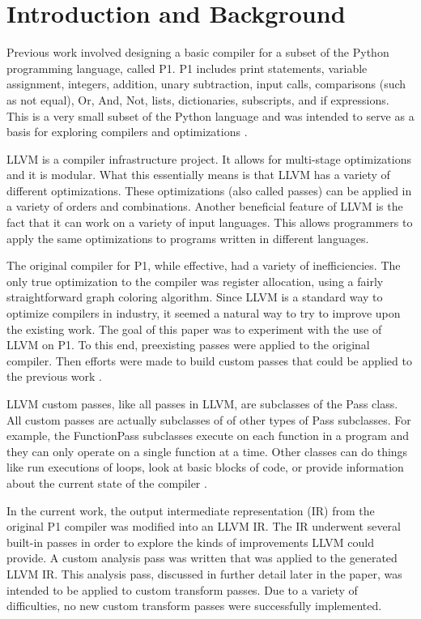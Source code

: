 \section{Introduction and Background}
Previous work involved designing a basic compiler for a subset of the Python programming language, called P1. P1 includes print statements, variable assignment, integers, addition, unary subtraction, input calls, comparisons (such as not equal), Or, And, Not, lists, dictionaries, subscripts, and if expressions. This is a very small subset of the Python language and was intended to serve as a basis for exploring compilers and optimizations \cite{Chang17}.

LLVM is a compiler infrastructure project. It allows for multi-stage optimizations and it is modular. What this essentially means is that LLVM has a variety of different optimizations. These optimizations (also called passes) can be applied in a variety of orders and combinations. Another beneficial feature of LLVM is the fact that it can work on a variety of input languages. This allows programmers to apply the same optimizations to programs written in different languages\cite{LLVMIR,Lattner07}.

The original compiler for P1, while effective, had a variety of inefficiencies. The only true optimization to the compiler was register allocation, using a fairly straightforward graph coloring algorithm. Since LLVM is a standard way to optimize compilers in industry, it seemed a natural way to try to improve upon the existing work. The goal of this paper was to experiment with the use of LLVM on P1. To this end, preexisting passes were applied to the original compiler. Then efforts were made to build custom passes that could be applied to the previous work \cite{Chang17}.

LLVM custom passes, like all passes in LLVM, are subclasses of the Pass class. All custom passes are actually subclasses of of other types of Pass subclasses. For example, the FunctionPass subclasses execute on each function in a program and they can only operate on a single function at a time. Other classes can do things like run executions of loops, look at basic blocks of code, or provide information about the current state of the compiler \cite{LLVMIR}.

In the current work, the output intermediate representation (IR) from the original P1 compiler was modified into an LLVM IR. The IR underwent several built-in passes in order to explore the kinds of improvements LLVM could provide. A custom analysis pass was written that was applied to the generated LLVM IR. This analysis pass, discussed in further detail later in the paper, was intended to be applied to custom transform passes. Due to a variety of difficulties, no new custom transform passes were successfully implemented.

